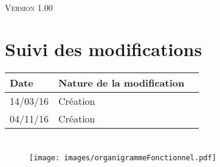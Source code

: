 \documentclass[asi, sansVersion]{picInsa}
\begin{document}
	\begin{center}
		\LARGE
		\textsc{
			\OF{}\\
			Version 1.00
		}
	\end{center}
	\vspace{0.5cm}

	\section*{Suivi des modifications}
		\begin{table}[H]
			\centering
			\begin{tabularx}{18cm}{|p{1.7cm}|X|p{4cm}|}
				\hline
				\rowcolor[gray]{0.90} Date & Nature de la modification \\
				\hline
				
				14/03/16 & Création \\
				04/11/16 & Création \\
				\hline
			\end{tabularx}
		\end{table}

	\section*{\OF}
		\begin{figure}[h]
				\texttt{[image: images/organigrammeFonctionnel.pdf]}
		\end{figure}
\end{document}
